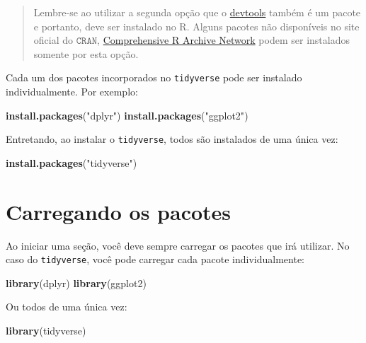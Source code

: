 \documentclass[
]{book}
\newenvironment{Shaded}{\begin{snugshade}}{\end{snugshade}}
\newcommand{\KeywordTok}[1]{\textcolor[rgb]{0.13,0.29,0.53}{\textbf{#1}}}
\newcommand{\NormalTok}[1]{#1}
\newcommand{\StringTok}[1]{\textcolor[rgb]{0.31,0.60,0.02}{#1}}
\begin{document}
\begin{quote}
Lembre-se ao utilizar a segunda opção que o \href{https://cran.r-project.org/web/packages/devtools/index.html}{devtools} também é um pacote e portanto, deve ser instalado no R. Alguns pacotes não disponíveis no site oficial do \(\texttt{CRAN}\), \href{https://cran.r-project.org/}{Comprehensive R Archive Network} podem ser instalados somente por esta opção.
\end{quote}

Cada um dos pacotes incorporados no \texttt{tidyverse} pode ser instalado individualmente. Por exemplo:

\begin{Shaded}
\begin{Highlighting}[]
\KeywordTok{install.packages}\NormalTok{(}\StringTok{"dplyr"}\NormalTok{)}
\KeywordTok{install.packages}\NormalTok{(}\StringTok{"ggplot2"}\NormalTok{)}
\end{Highlighting}
\end{Shaded}

Entretando, ao instalar o \texttt{tidyverse}, todos são instalados de uma única vez:

\begin{Shaded}
\begin{Highlighting}[]
\KeywordTok{install.packages}\NormalTok{(}\StringTok{"tidyverse"}\NormalTok{)}
\end{Highlighting}
\end{Shaded}

\hypertarget{carregando-os-pacotes}{%
\section{Carregando os pacotes}\label{carregando-os-pacotes}}

Ao iniciar uma seção, você deve sempre carregar os pacotes que irá utilizar. No caso do \texttt{tidyverse}, você pode carregar cada pacote individualmente:

\begin{Shaded}
\begin{Highlighting}[]
\KeywordTok{library}\NormalTok{(dplyr)}
\KeywordTok{library}\NormalTok{(ggplot2)}
\end{Highlighting}
\end{Shaded}

Ou todos de uma única vez:

\begin{Shaded}
\begin{Highlighting}[]
\KeywordTok{library}\NormalTok{(tidyverse)}
\end{Highlighting}
\end{Shaded}
\end{document}
